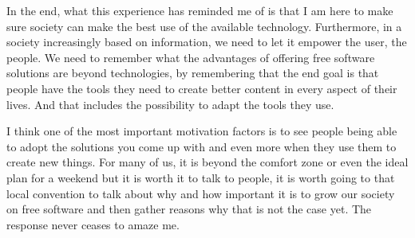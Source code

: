 In the end, what this experience has reminded me of is that I am here to make sure society can make the best use of the available technology. Furthermore, in a society increasingly based on information, we need to let it empower the user, the people. We need to remember what the advantages of offering free software solutions are beyond technologies, by remembering that the end goal is that people have the tools they need to create better content in every aspect of their lives. And that includes the possibility to adapt the tools they use.

I think one of the most important motivation factors is to see people being able to adopt the solutions you come up with and even more when they use them to create new things. For many of us, it is beyond the comfort zone or even the ideal plan for a weekend but it is worth it to talk to people, it is worth going to that local convention to talk about why and how important it is to grow our society on free software and then gather reasons why that is not the case yet. The response never ceases to amaze me.
